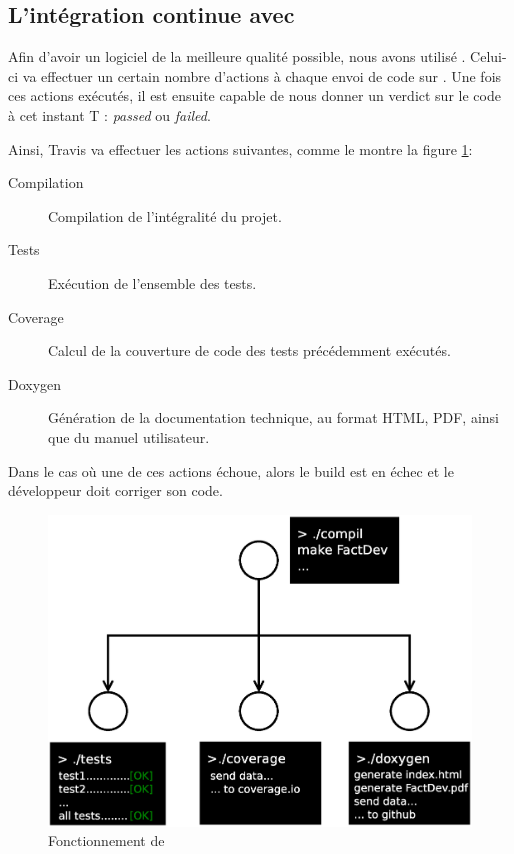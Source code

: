 \subsection{L'intégration continue avec \Travis}
Afin d'avoir un logiciel de la meilleure qualité possible, nous avons utilisé \Travis. Celui-ci va effectuer un certain nombre d'actions à chaque
envoi de code sur \Github. Une fois ces actions exécutés, il est ensuite capable de nous donner un verdict sur le code à cet instant T :
\textit{passed} ou \textit{failed}.

Ainsi, Travis va effectuer les actions suivantes, comme le montre la figure \ref{fig:travis}:
\begin{description}
	\item[Compilation] Compilation de l'intégralité du projet.
	\item[Tests] Exécution de l'ensemble des tests.
	\item[Coverage] Calcul de la couverture de code des tests précédemment exécutés. 
	\item[Doxygen] Génération de la documentation technique, au format HTML, PDF, ainsi que du manuel utilisateur.
\end{description}

Dans le cas où une de ces actions échoue, alors le build est en échec et le développeur doit corriger son code.
\begin{figure}[H]
	\centering
	\includegraphics*[width=18cm]{travis.eps}
	\caption{Fonctionnement de \Travis}
	\label{fig:travis}
\end{figure}

